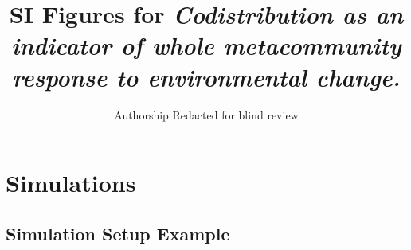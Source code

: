\documentclass[
]{article}
\title{SI Figures for \emph{Codistribution as an indicator of whole
metacommunity response to environmental change.}}
\author{Authorship Redacted for blind review}
\date{}
\begin{document}
\maketitle

{
\setcounter{tocdepth}{2}
\tableofcontents
}
\newpage

\hypertarget{simulations}{%
\section{Simulations}\label{simulations}}

\hypertarget{simulation-setup-example}{%
\subsection{Simulation Setup Example}\label{simulation-setup-example}}
\end{document}
